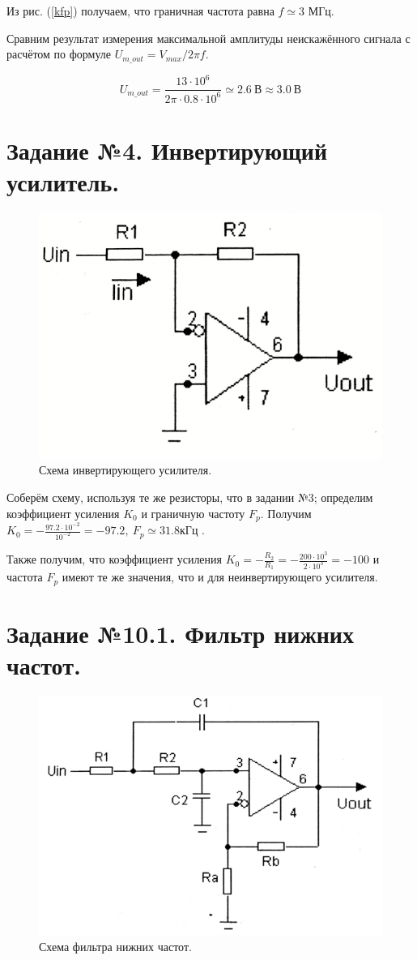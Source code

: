 \documentclass[a4paper, 12pt, twoside]{article}
\begin{document}
Из рис. (\ref{kfp}) получаем, что граничная частота равна $f \simeq 3$ МГц.
\vspace{\baselineskip}

Сравним результат измерения максимальной амплитуды неискажённого сигнала с расчётом по формуле $U_{m\_out} = V_{max}/2\pi f$.
\vspace{\baselineskip}

$$ U_{m\_out} = \dfrac{ 13\cdot 10^6}{2\pi \cdot 0.8 \cdot 10^6} \simeq  2.6~\text{В} \approx 3.0 ~ \text{В}$$ 

\section*{Задание №4. Инвертирующий усилитель.}

\begin{figure}[H]
	\centering
	\includegraphics[width =  0.3\linewidth]{IMG_0662}
	\caption{Схема инвертирующего усилителя.}
	\label{schinv}
\end{figure}


Соберём схему, используя те же резисторы, что в задании №3; определим коэффициент усиления $K_0$ и граничную частоту $F_p$. Получим $K_0 = -\frac{97.2 \cdot 10^{-2}}{10^{-2}} = -97.2, ~ F_p \simeq 31.8\text{кГц}$ .

Также получим, что коэффициент усиления $K_0 = -\frac{R_2}{R_1} = - \frac{200 \cdot 10^3}{2\cdot 10^3} = -100$ и частота $F_p$ имеют те же значения, что и для неинвертирующего усилителя.
\newpage
\section*{Задание №10.1. Фильтр нижних частот.}

\begin{figure}[H]
	\centering
	\includegraphics[width =  0.3\linewidth]{IMG_0663}
	\caption{Схема фильтра нижних частот.}
	\label{schinv}
\end{figure}
\end{document}
